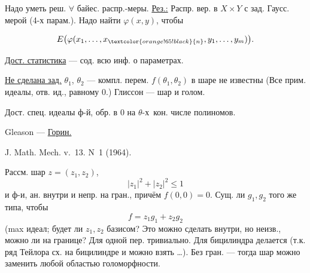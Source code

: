 Надо уметь реш. $\forall$ байес. распр.-меры.
\underline{Рез.:} Распр. вер. в $X\times Y$ с зад. Гаусс. мерой (4-х парам.).
Надо найти $\varphi(x,y)$, чтобы
\par\noindent\begin{minipage}{\linewidth}
\begin{equation*}
E\bigl(\varphi(x_1,\ldots,x_{\textcolor{orange!65!black}{n}},y_1,\ldots,y_m)\bigr).
\end{equation*}
\end{minipage}\par
\underline{Дост. статистика} --- сод. всю инф. о параметрах.

\underline{Не сделана зад.}
$\theta_1$, $\theta_2$ --- компл. перем.
$f(\theta_1,\theta_2)$ в шаре не известны 
(Все прим. идеалы, отв. ид., равному 0.)
Глиссон --- шар и  голом.
\par\noindent\begin{minipage}{\linewidth}
Дост. спец. идеалы ф-й, обр. в $0$ на \textcolor{orange!65!black}{$\theta$-х}\ кон. числе полиномов.
\end{minipage}\par

Gleason — \underline{Горин.}

\par\noindent\begin{minipage}{\linewidth}
J. Math. Mech. v.~13. N~1 (1964).
\end{minipage}\par

Рассм. шар $z=(z_1,z_2)$,
\begin{equation*}
|z_1|^2+|z_2|^2\leq1
\end{equation*}
и ф-и, ан. внутри и непр. на гран., причём $f(0,0)=0$.
Сущ. ли $g_1,g_2$ того же типа, чтобы
\begin{equation*}
f=z_1g_1+z_2g_2
\end{equation*}
(max идеал; будет ли $z_1,z_2$ базисом?
Это можно сделать внутри, но неизв., можно ли на границе?
Для одной пер. тривиально.
Для бицилиндра делается (т.к. ряд Тейлора сх. на бицилиндре и можно взять \ldots).
Без гран. — тогда шар можно заменить любой областью голоморфности.

